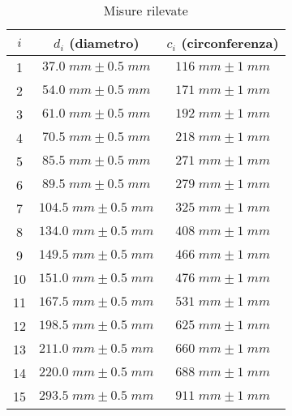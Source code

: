 \begin{table}[h!]
    
    \hspace{5mm} 
    \begin{tabular}{|c|c|c|}
        \hline
        $i$ & $d_i$ (diametro) & $c_i$ (circonferenza)\\
        \hline

        1  & $37.0 \;mm \pm 0.5 \;mm$ & $116 \;mm \pm 1 \;mm$\\ 
        2  & $54.0 \;mm \pm 0.5 \;mm$ & $171 \;mm \pm 1 \;mm$\\ 
        3  & $61.0 \;mm \pm 0.5 \;mm$ & $192 \;mm \pm 1 \;mm$\\ 
        4  & $70.5 \;mm \pm 0.5 \;mm$ & $218 \;mm \pm 1 \;mm$\\ 
        5  & $85.5 \;mm \pm 0.5 \;mm$ & $271 \;mm \pm 1 \;mm$\\ 
        6  & $89.5 \;mm \pm 0.5 \;mm$ & $279 \;mm \pm 1 \;mm$\\ 
        7  & $104.5 \;mm \pm 0.5 \;mm$ & $325 \;mm \pm 1 \;mm$\\ 
        8  & $134.0 \;mm \pm 0.5 \;mm$ & $408 \;mm \pm 1 \;mm$\\ 
        9  & $149.5 \;mm \pm 0.5 \;mm$ & $466 \;mm \pm 1 \;mm$\\ 
        10 & $151.0 \;mm \pm 0.5 \;mm$ & $476 \;mm \pm 1 \;mm$\\ 
        11 & $167.5 \;mm \pm 0.5 \;mm$ & $531 \;mm \pm 1 \;mm$\\ 
        12 & $198.5 \;mm \pm 0.5 \;mm$ & $625 \;mm \pm 1 \;mm$\\ 
        13 & $211.0 \;mm \pm 0.5 \;mm$ & $660 \;mm \pm 1 \;mm$\\ 
        14 & $220.0 \;mm \pm 0.5 \;mm$ & $688 \;mm \pm 1 \;mm$\\ 
        15 & $293.5 \;mm \pm 0.5 \;mm$ & $911 \;mm \pm 1 \;mm$\\ 


        \hline
    \end{tabular}
    \caption{Misure rilevate}
    \label{tabellaDati}
\end{table}

